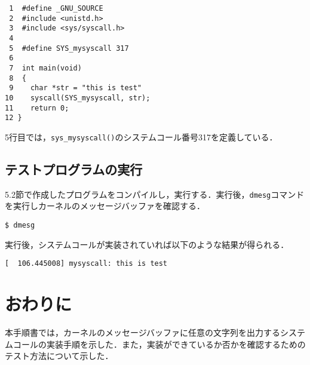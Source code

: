 \documentclass[12pt]{jsarticle}
\begin{document}
\begin{verbatim}
 1  #define _GNU_SOURCE
 2  #include <unistd.h>
 3  #include <sys/syscall.h>
 4
 5  #define SYS_mysyscall 317
 6 
 7  int main(void)
 8  {
 9    char *str = "this is test"
10    syscall(SYS_mysyscall, str);
11    return 0;
12 } 
\end{verbatim}
5行目では，\verb|sys_mysyscall()|のシステムコール番号317を定義している．

\subsection{テストプログラムの実行}
5.2節で作成したプログラムをコンパイルし，実行する．実行後，\verb|dmesg|コマンドを実行しカーネルのメッセージバッファを確認する．

\begin{verbatim}
$ dmesg
\end{verbatim}

実行後，システムコールが実装されていれば以下のような結果が得られる．
\begin{verbatim}
[  106.445008] mysyscall: this is test
\end{verbatim}

\section{おわりに}
\label{sec:conclusion}
本手順書では，カーネルのメッセージバッファに任意の文字列を出力するシステムコールの実装手順を示した．また，実装ができているか否かを確認するためのテスト方法について示した．



\end{document}
